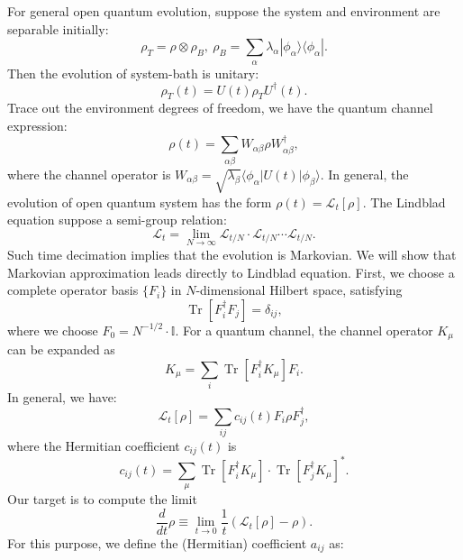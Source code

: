 \documentclass[aps,prb,superscriptaddress,nofootinbib]{revtex4}
\def \Tr{\operatorname{Tr}}
\begin{document}
For general open quantum evolution, suppose the system and environment are separable initially:
\begin{equation}
	\rho_T=\rho\otimes\rho_B,\ \rho_B=\sum_\alpha \lambda_\alpha |\phi_\alpha\rangle\langle\phi_\alpha |.
\end{equation}
Then the evolution of system-bath is unitary:
\begin{equation}
	\rho_T(t) = U(t)\rho_TU^\dagger(t).
\end{equation}
Trace out the environment degrees of freedom, we have the quantum channel expression:
\begin{equation}
	\rho(t) = \sum_{\alpha\beta} W_{\alpha\beta} \rho W^\dagger_{\alpha\beta},
\end{equation}
where the channel operator is $W_{\alpha\beta} = \sqrt{\lambda_\beta} \langle\phi_\alpha|U(t)|\phi_\beta\rangle$.
In general, the evolution of open quantum system has the form $\rho(t) = \mathcal{L}_t[\rho]$.
The Lindblad equation suppose a semi-group relation:
\begin{equation}
	\mathcal{L}_t = \lim_{N \rightarrow \infty} \mathcal{L}_{t/N}\cdot\mathcal{L}_{t/N}\cdots \mathcal{L}_{t/N}.
\end{equation}
Such time decimation implies that the evolution is Markovian.
We will show that Markovian approximation leads directly to Lindblad equation.
First, we choose a complete operator basis $\{F_i\}$ in $N$-dimensional Hilbert space, satisfying
\begin{equation}
	\Tr[F_i^\dagger F_j] = \delta_{ij},
\end{equation}
where we choose $F_0=N^{-1/2} \cdot\mathbb I$. 
For a quantum channel, the channel operator $K_\mu$ can be expanded as
\begin{equation}
	K_\mu = \sum_i \Tr[F_i^\dagger K_\mu]F_i.
\end{equation}
In general, we have:
\begin{equation}
	\mathcal{L}_t[\rho] = \sum_{ij}c_{ij}(t)F_i\rho F_j^\dagger,
\end{equation}
where the Hermitian coefficient $c_{ij}(t)$ is
\begin{equation}
	c_{ij}(t) = \sum_{\mu} \Tr[F_i^\dagger K_\mu]\cdot \Tr[F_j^\dagger K_\mu]^*.
\end{equation}
Our target is to compute the limit
\begin{equation}
	\frac{d}{dt} \rho \equiv \lim_{t\rightarrow 0} \frac{1}{t}(\mathcal{L}_t[\rho]-\rho).
\end{equation}
For this purpose, we define the (Hermitian) coefficient $a_{ij}$ as:
\end{document}
